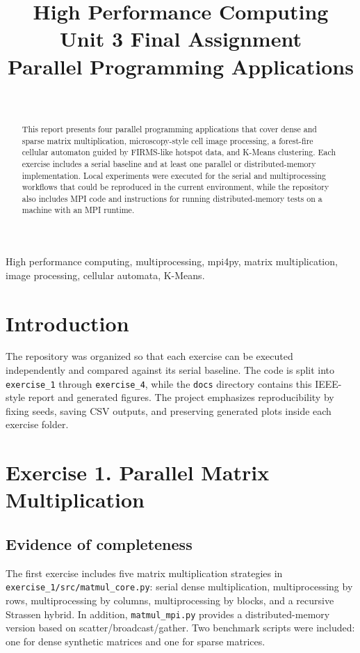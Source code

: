 \documentclass[conference]{IEEEtran}
\title{High Performance Computing\\Unit 3 Final Assignment\\Parallel Programming Applications}
\author{\IEEEauthorblockN{Gael Alberto Lara Peña}\\
\IEEEauthorblockA{Universidad Politécnica de Yucatán\\Data Engineering 7A}}
\begin{document}
\maketitle
\begin{abstract}
This report presents four parallel programming applications that cover dense and sparse matrix multiplication, microscopy-style cell image processing, a forest-fire cellular automaton guided by FIRMS-like hotspot data, and K-Means clustering. Each exercise includes a serial baseline and at least one parallel or distributed-memory implementation. Local experiments were executed for the serial and multiprocessing workflows that could be reproduced in the current environment, while the repository also includes MPI code and instructions for running distributed-memory tests on a machine with an MPI runtime.
\end{abstract}
\begin{IEEEkeywords}
High performance computing, multiprocessing, mpi4py, matrix multiplication, image processing, cellular automata, K-Means.
\end{IEEEkeywords}

\section{Introduction}
The repository was organized so that each exercise can be executed independently and compared against its serial baseline. The code is split into \texttt{exercise\_1} through \texttt{exercise\_4}, while the \texttt{docs} directory contains this IEEE-style report and generated figures. The project emphasizes reproducibility by fixing seeds, saving CSV outputs, and preserving generated plots inside each exercise folder.

\section{Exercise 1. Parallel Matrix Multiplication}
\subsection{Evidence of completeness}
The first exercise includes five matrix multiplication strategies in \texttt{exercise\_1/src/matmul\_core.py}: serial dense multiplication, multiprocessing by rows, multiprocessing by columns, multiprocessing by blocks, and a recursive Strassen hybrid. In addition, \texttt{matmul\_mpi.py} provides a distributed-memory version based on scatter/broadcast/gather. Two benchmark scripts were included: one for dense synthetic matrices and one for sparse matrices.
\end{document}
